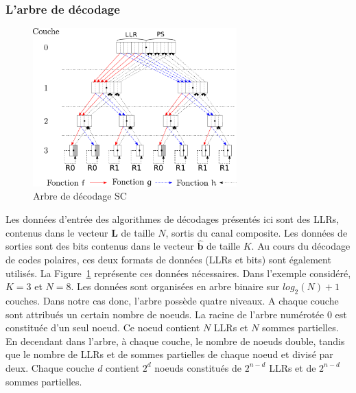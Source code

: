 \subsubsection{L'arbre de décodage}
\begin{figure}[t]
\centering
\includegraphics[width=0.7\textwidth]{main/ch1_fig/sc}
\caption{Arbre de décodage SC}
\label{fig:sc}
\end{figure}
Les données d'entrée des algorithmes de décodages présentés ici sont des LLRs, contenus dans le vecteur $\mathbold{L}$ de taille $N$, sortis du canal composite. Les données de sorties sont des bits contenus dans le vecteur $\mathbold{\hat{b}}$ de taille $K$. Au cours du décodage de codes polaires, ces deux formats de données (LLRs et bits) sont également utilisés. La Figure~\ref{fig:sc} représente ces données nécessaires. Dans l'exemple considéré, $K=3$ et $N=8$. Les données sont organisées en arbre binaire sur $log_2(N) + 1$ couches. Dans notre cas donc, l'arbre possède quatre niveaux. A chaque couche sont attribués un certain nombre de noeuds. La racine de l'arbre numérotée $0$ est constituée d'un seul noeud. Ce noeud contient $N$ LLRs et $N$ sommes partielles. En decendant dans l'arbre, à chaque couche, le nombre de noeuds double, tandis que le nombre de LLRs et de sommes partielles de chaque noeud et divisé par deux. Chaque couche $d$ contient $2^d$ noeuds constitués de $2^{n-d}$ LLRs et de $2^{n-d}$ sommes partielles. 

